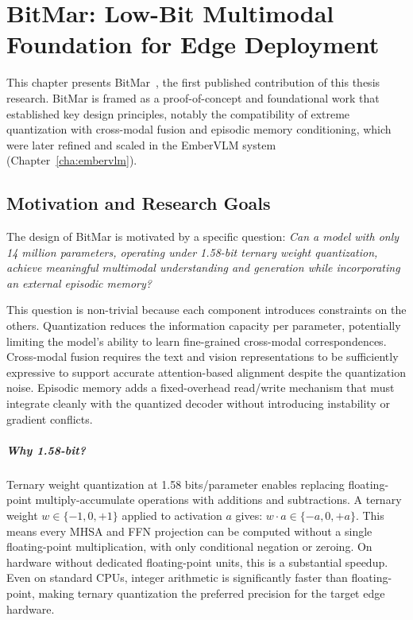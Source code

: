 \chapter{BitMar: Low-Bit Multimodal Foundation for Edge Deployment}
\label{cha:bitmar}

This chapter presents BitMar~\cite{aman2025bitmar}, the first published contribution of this thesis research. BitMar is framed as a proof-of-concept and foundational work that established key design principles, notably the compatibility of extreme quantization with cross-modal fusion and episodic memory conditioning, which were later refined and scaled in the EmberVLM system (Chapter~\ref{cha:embervlm}).

\section{Motivation and Research Goals}
\label{sec:bitmar_motivation}

The design of BitMar is motivated by a specific question: \emph{Can a model with only 14 million parameters, operating under 1.58-bit ternary weight quantization, achieve meaningful multimodal understanding and generation while incorporating an external episodic memory?}

This question is non-trivial because each component introduces constraints on the others. Quantization reduces the information capacity per parameter, potentially limiting the model's ability to learn fine-grained cross-modal correspondences. Cross-modal fusion requires the text and vision representations to be sufficiently expressive to support accurate attention-based alignment despite the quantization noise. Episodic memory adds a fixed-overhead read/write mechanism that must integrate cleanly with the quantized decoder without introducing instability or gradient conflicts.

\paragraph{Why 1.58-bit?} Ternary weight quantization at 1.58 bits/parameter enables replacing floating-point multiply-accumulate operations with additions and subtractions. A ternary weight $w \in \{-1, 0, +1\}$ applied to activation $a$ gives: $w \cdot a \in \{-a, 0, +a\}$. This means every MHSA and FFN projection can be computed without a single floating-point multiplication, with only conditional negation or zeroing. On hardware without dedicated floating-point units, this is a substantial speedup. Even on standard CPUs, integer arithmetic is significantly faster than floating-point, making ternary quantization the preferred precision for the target edge hardware.

